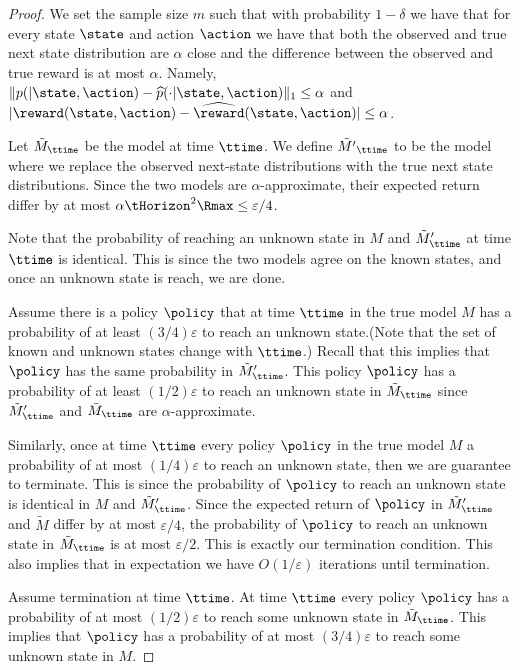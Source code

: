 \begin{proof}
We set the sample size $m$ such that with probability $1-\delta$ we
have that for every state $\state$ and action $\action$ we have that
both the observed and true next state distribution are $\alpha$
close and the difference between the observed and true reward is at
most $\alpha$. Namely,
$\|p(|\state,\action)-\widehat{p}(\cdot|\state,\action)\|_1\leq
\alpha$ and
$|\reward(\state,\action)-\widehat{\reward}(\state,\action)|\leq
\alpha$.

Let $\tilde{M}_\ttime$ be the model at time $\ttime$. We define
$\tilde{M'}_\ttime$ to be the model where we replace the observed
next-state distributions with the true next state distributions.
Since the two models are $\alpha$-approximate, their expected return
differ by at most $\alpha\tHorizon^2\Rmax\leq \varepsilon/4$.

Note that the probability of reaching an unknown state in $M$ and
$\tilde{M}'_\ttime$ at time $\ttime$ is identical. This is since the
two models agree on the known states, and once an unknown state is
reach, we are done.

Assume there is a policy $\policy$ that at time $\ttime$ in the true
model $M$ has a probability of at least $(3/4)\varepsilon$ to reach
an unknown state.(Note that the set of known and unknown states
change with $\ttime$.) Recall that this implies that $\policy$ has
the same probability in $\tilde{M}'_\ttime$. This policy $\policy$
has a probability of at least $(1/2)\varepsilon$ to reach an unknown
state in $\tilde{M}_\ttime$ since $\tilde{M}'_\ttime$ and
$\tilde{M}_\ttime$ are $\alpha$-approximate.

Similarly, once at time $\ttime$ every policy $\policy$ in the true
model $M$ a probability of at most $(1/4)\varepsilon$ to reach an
unknown state, then we are guarantee to terminate. This is since the
probability of $\policy$ to reach an unknown state is identical in
$M$ and $\tilde{M}'_\ttime$. Since the expected return of $\policy$
in $\tilde{M}'_\ttime$ and $\tilde{M}$ differ by at most
$\varepsilon/4$, the probability of $\policy$ to reach an unknown
state in $\tilde{M}_\ttime$ is at most $\varepsilon/2$. This is
exactly our termination condition.
%
This also implies that in expectation we have $O(1/\varepsilon)$
iterations until termination.

Assume termination at time $\ttime$. At time $\ttime$ every policy
$\policy$ has a probability of at most $(1/2)\varepsilon$ to reach
some unknown state in $\tilde{M}_\ttime$. This implies that
$\policy$ has a probability of at most $(3/4)\varepsilon$ to reach
some unknown state in $M$.



\end{proof}
